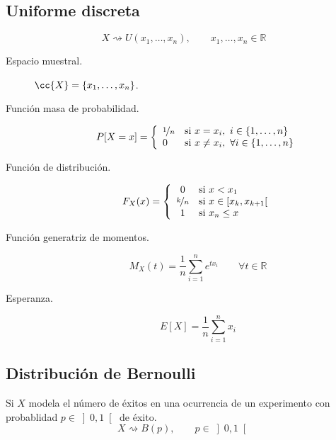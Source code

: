 \subsection{Uniforme discreta}
\begin{equation*}
    X\rightsquigarrow U(x_1, \ldots, x_n), \qquad x_1,\ldots,x_n \in \mathbb{R}
\end{equation*}
\begin{description}
    \item [Espacio muestral.] $\cc{X} = \{x_1, \ldots, x_n\}$.
    \item [Función masa de probabilidad.] 
        \begin{equation*}
            P[X=x] = \left\{\begin{array}{ll}
                \nicefrac{1}{n} & \text{si\ } x=x_i,~i \in \{1,\ldots,n\} \\
                0 & \text{si\ } x\neq x_i,~\forall i \in \{1,\ldots,n\}
            \end{array}\right. 
        \end{equation*}
    \item [Función de distribución.] 
        \begin{equation*}
            F_X(x) = \left\{\begin{array}{cl}
                0 & \text{si\ } x<x_1 \\
                \nicefrac{k}{n} & \text{si\ } x\in \left[x_k,x_{k+1}\right[\\
                 1& \text{si\ } x_n\leq x
            \end{array}\right. 
        \end{equation*}
    \item [Función generatriz de momentos.] 
        \begin{equation*}
            M_X(t) = \dfrac{1}{n}\sum_{i =1}^{n} e^{tx_i} \qquad \forall t\in \mathbb{R}
        \end{equation*}
    \item [Esperanza.] 
        \begin{equation*}
            E[X] = \dfrac{1}{n}\sum_{i=1}^{n}x_i
        \end{equation*}
\end{description}

\subsection{Distribución de Bernoulli}
\noindent
Si $X$ modela el número de éxitos en una ocurrencia de un experimento con probablidad $p\in \left]0,1\right[$ de éxito.
\begin{equation*}
    X\rightsquigarrow B(p), \qquad p\in \left]0,1\right[
\end{equation*}

